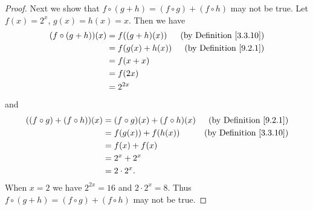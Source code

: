 \begin{proof}
    Next we show that \(f \circ (g + h) = (f \circ g) + (f \circ h)\) may not be true.
    Let \(f(x) = 2^x\), \(g(x) = h(x) = x\).
    Then we have
    \begin{align*}
        (f \circ (g + h))(x) & = f((g + h)(x))  & \text{(by Definition \ref{3.3.10})} \\
                             & = f(g(x) + h(x)) & \text{(by Definition \ref{9.2.1})}  \\
                             & = f(x + x)                                             \\
                             & = f(2x)                                                \\
                             & = 2^{2x}
    \end{align*}
    and
    \begin{align*}
        ((f \circ g) + (f \circ h))(x) & = (f \circ g)(x) + (f \circ h)(x) & \text{(by Definition \ref{9.2.1})}  \\
                                       & = f(g(x)) + f(h(x))               & \text{(by Definition \ref{3.3.10})} \\
                                       & = f(x) + f(x)                                                           \\
                                       & = 2^x + 2^x                                                             \\
                                       & = 2 \cdot 2^x.
    \end{align*}
    When \(x = 2\) we have \(2^{2x} = 16\) and \(2 \cdot 2^x = 8\).
    Thus \(f \circ (g + h) = (f \circ g) + (f \circ h)\) may not be true.


\end{proof}
